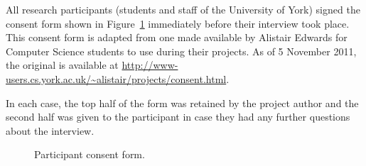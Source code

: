 \documentclass[]{scrartcl}
\begin{document}
All research participants (students and staff of the University of York)
signed the consent form shown in Figure~\ref{participantconsent} immediately
before their interview took place. This consent form is adapted from one made
available by Alistair Edwards for Computer Science students to use during
their projects. As of 5 November 2011, the original is available at
\url{http://www-users.cs.york.ac.uk/~alistair/projects/consent.html}.

In each case, the top half of the form was retained by the project author and
the second half was given to the participant in case they had any further
questions about the interview.

\begin{figure}[h]
  \begin{center}
  \end{center}
  \caption{Participant consent form.}
  \label{participantconsent}
\end{figure}

\newpage
\printglossaries

\newpage

\end{document}

